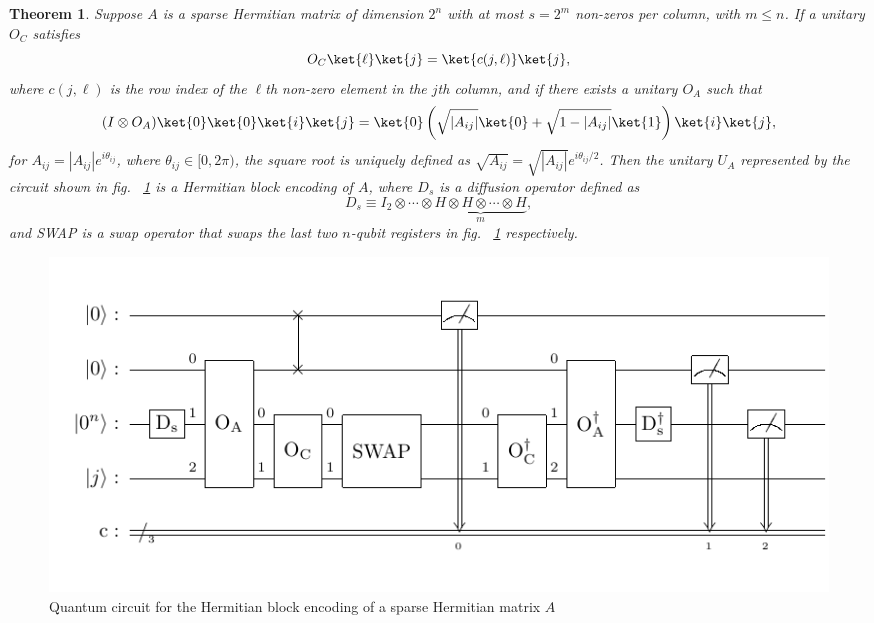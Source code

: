\documentclass{article}
\newtheorem{theorem}{Theorem}[section]
\begin{document}
\begin{theorem}
  Suppose $A$ is a sparse Hermitian matrix of dimension $2^n$ with at most $s = 2^m$ non-zeros per column, with $m \leq n$. If a unitary $O_C$ satisfies
  \begin{equation}
    O_C \ket{\ell} \ket{j} = \ket{c(j, \ell)} \ket{j},
  \end{equation}
  where $c(j, \ell)$ is the row index of the $\ell$th non-zero element in the $j$th column, and if there exists a unitary $O_A$ such that
  \begin{equation}
    (I \otimes O_A) \ket{0} \ket{0} \ket{i} \ket{j} = \ket{0} \left( \sqrt{|A_{ij}|} \ket{0} + \sqrt{1 - |A_{ij}|} \ket{1} \right) \ket{i} \ket{j},
  \end{equation}
  for $A_{ij} = |A_{ij}| e^{i \theta_{ij}}$, where $\theta_{ij} \in [0, 2\pi)$, the square root is uniquely defined as $\sqrt{A_{ij}} = \sqrt{|A_{ij}|} e^{i \theta_{ij}/2}$. Then the unitary $U_A$ represented by the circuit shown in fig. ~\ref{fig:hermitian_encoding} is a Hermitian block encoding of $A$, where $D_s$ is a diffusion operator defined as
  \begin{equation}
    D_s \equiv I_2 \otimes \cdots \otimes
    \underbrace{H \otimes H \otimes \cdots \otimes H}_{m},
  \end{equation}
  and SWAP is a swap operator that swaps the last two $n$-qubit registers in fig. ~\ref{fig:hermitian_encoding} respectively.
  \label{thm:main_result2}
\end{theorem}

\begin{figure}[htbp]
  \centering
  \includegraphics{pdf/hermitian_circuit}
  \caption{Quantum circuit for the Hermitian block encoding of a sparse Hermitian matrix $A$}
  \label{fig:hermitian_encoding}
\end{figure}



\end{document}
